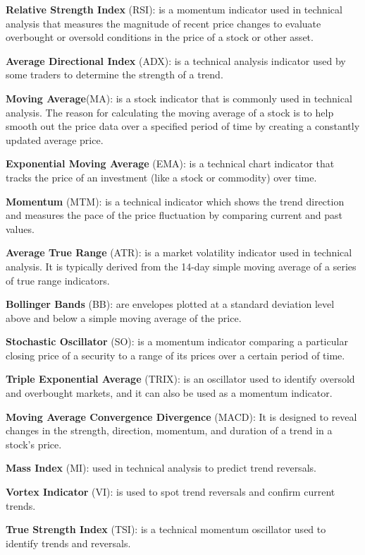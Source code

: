 \textbf{Relative Strength Index} (RSI): is a momentum indicator used in technical analysis that measures the magnitude of recent price changes to evaluate overbought or oversold conditions in the price of a stock or other asset.


\textbf{Average Directional Index }(ADX): is a technical analysis indicator used by some traders to determine the strength of a trend.


\textbf{Moving Average}(MA): is a stock indicator that is commonly used in technical analysis. The reason for calculating the moving average of a stock is to help smooth out the price data over a specified period of time by creating a constantly updated average price.



\textbf{Exponential Moving Average }(EMA): is a technical chart indicator that tracks the price of an investment (like a stock or commodity) over time.

\textbf{Momentum} (MTM): is a technical indicator which shows the trend direction and measures the pace of the price fluctuation by comparing current and past values.

\textbf{Average True Range} (ATR): is a market volatility indicator used in technical analysis. It is typically derived from the 14-day simple moving average of a series of true range indicators.


\textbf{Bollinger Bands} (BB): are envelopes plotted at a standard deviation level above and below a simple moving average of the price.


\textbf{Stochastic Oscillator} (SO): is a momentum indicator comparing a particular closing price of a security to a range of its prices over a certain period of time.


\textbf{Triple Exponential Average} (TRIX): is an oscillator used to identify oversold and overbought markets, and it can also be used as a momentum indicator.


\textbf{Moving Average Convergence Divergence} (MACD): It is designed to reveal changes in the strength, direction, momentum, and duration of a trend in a stock's price. 



\textbf{Mass Index }(MI): used in technical analysis to predict trend reversals.


\textbf{Vortex Indicator }(VI): is used to spot trend reversals and confirm current trends.


\textbf{True Strength Index} (TSI): is a technical momentum oscillator used to identify trends and reversals.

